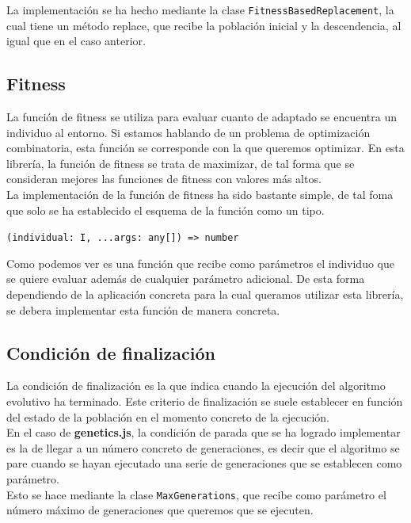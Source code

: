 La implementación se ha hecho mediante la clase \texttt{FitnessBasedReplacement}, la cual tiene un método replace, que recibe la población inicial y la descendencia, al igual que en el caso anterior.

\subsection{Fitness}

La función de fitness se utiliza para evaluar cuanto de adaptado se encuentra un individuo al entorno. Si estamos hablando de un problema de optimización combinatoria, esta función se corresponde con la que queremos optimizar. En esta librería, la función de fitness se trata de maximizar, de tal forma que se consideran mejores las funciones de fitness con valores más altos.\\

La implementación de la función de fitness ha sido bastante simple, de tal foma que solo se ha establecido el esquema de la función como un tipo.

\begin{center}
    \texttt{(individual: I, ...args: any[]) => number}
\end{center}

Como podemos ver es una función que recibe como parámetros el individuo que se quiere evaluar además de cualquier parámetro adicional. De esta forma dependiendo de la aplicación concreta para la cual queramos utilizar esta librería, se debera implementar esta función de manera concreta.

\subsection{Condición de finalización}

La condición de finalización es la que indica cuando la ejecución del algoritmo evolutivo ha terminado. Este criterio de finalización se suele establecer en función del estado de la población en el momento concreto de la ejecución. \\

En el caso de \textbf{genetics.js}, la condición de parada que se ha logrado implementar es la de llegar a un número concreto de generaciones, es decir que el algoritmo se pare cuando se hayan ejecutado una serie de generaciones que se establecen como parámetro. \\

Esto se hace mediante la clase \texttt{MaxGenerations}, que recibe como parámetro el número máximo de generaciones que queremos que se ejecuten.